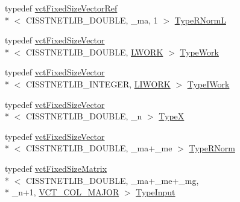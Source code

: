 \begin{DoxyCompactItemize}
\item 
typedef \hyperlink{classvct_fixed_size_vector_ref}{vct\-Fixed\-Size\-Vector\-Ref}\\*
$<$ C\-I\-S\-S\-T\-N\-E\-T\-L\-I\-B\-\_\-\-D\-O\-U\-B\-L\-E, \-\_\-ma, 1 $>$ \hyperlink{classnmr_l_sq_lin_solution_fixed_size_a61e14c469c463bc06a411061aad13b3a}{Type\-R\-Norm\-L}
\item 
typedef \hyperlink{classvct_fixed_size_vector}{vct\-Fixed\-Size\-Vector}\\*
$<$ C\-I\-S\-S\-T\-N\-E\-T\-L\-I\-B\-\_\-\-D\-O\-U\-B\-L\-E, \hyperlink{classnmr_l_sq_lin_solution_fixed_size_a98da54c74639066db38d3a6792e85f4bacacf0e784782d62fc0567d6c62575610}{L\-W\-O\-R\-K} $>$ \hyperlink{classnmr_l_sq_lin_solution_fixed_size_a2804f3b3815a82a0f9655bcd2f86e7e4}{Type\-Work}
\item 
typedef \hyperlink{classvct_fixed_size_vector}{vct\-Fixed\-Size\-Vector}\\*
$<$ C\-I\-S\-S\-T\-N\-E\-T\-L\-I\-B\-\_\-\-I\-N\-T\-E\-G\-E\-R, \hyperlink{classnmr_l_sq_lin_solution_fixed_size_add7e922c4749a9669d7b5ca830387287ae423106426616171263d79efdfc0b1dd}{L\-I\-W\-O\-R\-K} $>$ \hyperlink{classnmr_l_sq_lin_solution_fixed_size_a1838601b0a3e6fa7972e8854b888152a}{Type\-I\-Work}
\item 
typedef \hyperlink{classvct_fixed_size_vector}{vct\-Fixed\-Size\-Vector}\\*
$<$ C\-I\-S\-S\-T\-N\-E\-T\-L\-I\-B\-\_\-\-D\-O\-U\-B\-L\-E, \-\_\-n $>$ \hyperlink{classnmr_l_sq_lin_solution_fixed_size_aa00d3b54073dac6aba6e3793d4f88348}{Type\-X}
\item 
typedef \hyperlink{classvct_fixed_size_vector}{vct\-Fixed\-Size\-Vector}\\*
$<$ C\-I\-S\-S\-T\-N\-E\-T\-L\-I\-B\-\_\-\-D\-O\-U\-B\-L\-E, \-\_\-ma+\-\_\-me $>$ \hyperlink{classnmr_l_sq_lin_solution_fixed_size_a384dc1235386018c6edbdc782c5f84be}{Type\-R\-Norm}
\item 
typedef \hyperlink{classvct_fixed_size_matrix}{vct\-Fixed\-Size\-Matrix}\\*
$<$ C\-I\-S\-S\-T\-N\-E\-T\-L\-I\-B\-\_\-\-D\-O\-U\-B\-L\-E, \-\_\-ma+\-\_\-me+\-\_\-mg, \\*
\-\_\-n+1, \hyperlink{vct_forward_declarations_8h_a432cdf8923afaf82f551450ad4034746}{V\-C\-T\-\_\-\-C\-O\-L\-\_\-\-M\-A\-J\-O\-R} $>$ \hyperlink{classnmr_l_sq_lin_solution_fixed_size_adf9a982c0414dafb9fb1164b8da4f96f}{Type\-Input}
\end{DoxyCompactItemize}
